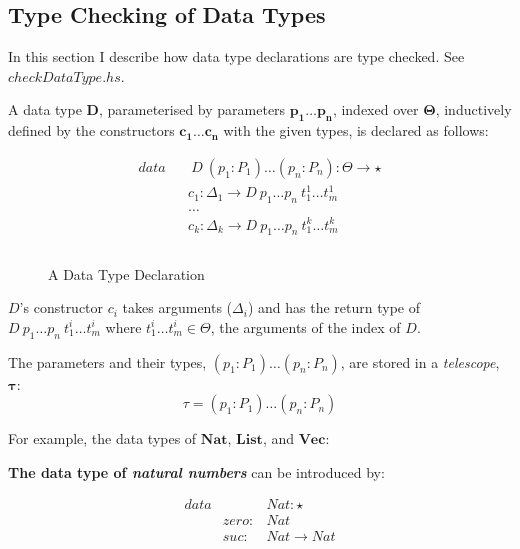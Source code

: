 \documentclass[acmsmall]{acmart}
\begin{document}
\subsection{Type Checking of Data Types}
\label{sec:datatypes}

In this section I describe how data type declarations are type checked. See \emph{$checkDataType.hs$}.

A data type $\boldsymbol{D}$, parameterised by parameters $\boldsymbol{p_1 \dots p_n}$, indexed over $\boldsymbol{\Theta}$, inductively defined by the constructors $\boldsymbol{c_1 \dots c_n}$ with the given types, is declared as follows:

\begin{figure}[H]
  \centering
  \begin{equation*}
    \begin{aligned}
      data &  & \: D \: (p_1:P_1) \dots (p_n:P_n) : \Theta \to \star       \\
           &  & c_1 : \Delta_1 \to D \: p_1 \dots p_n \: t_1^1 \dots t_m^1 \\
           &  & \dots                                                      \\
           &  & c_k : \Delta_k \to D \: p_1 \dots p_n \: t_1^k \dots t_m^k \\                                                           \\
    \end{aligned}
  \end{equation*}
  \caption{A Data Type Declaration}
  \label{fig:datatype}
\end{figure}

$D$'s constructor $c_i$ takes arguments ($\Delta_i$) and has the return type of $D \: p_1 \dots p_n \: t_1^i \dots t_m^i$ where $t_1^i \dots t_m^i \in \Theta$, the arguments of the index of $D$.

The parameters and their types, $(p_1:P_1) \dots (p_n:P_n)$, are stored in a \emph{telescope}, $\boldsymbol{\tau}$:
\begin{equation*}
  \tau = (p_1:P_1) \dots (p_n:P_n)  
\end{equation*}


For example, the data types of $\boldsymbol{Nat}$, $\boldsymbol{List}$, and $\boldsymbol{Vec}$:

\textbf{The data type of \emph{natural numbers}} can be introduced by:

\begin{equation*}
  \begin{aligned}
    data &       & Nat : \star \\
         & zero: & Nat         \\
         & suc:  & Nat \to Nat \\
  \end{aligned}
\end{equation*}
\end{document}
